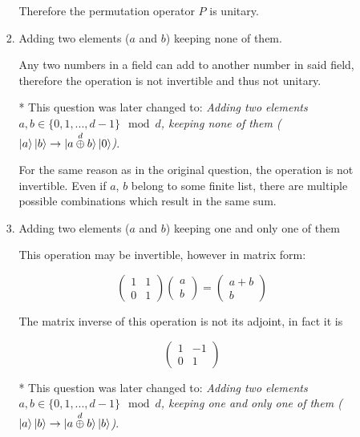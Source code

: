\documentclass[11pt]{article}
\begin{document}
\begin{enumerate}[label*=\arabic*.]
\begin{enumerate}[label*=\arabic*.]
\begin{enumerate}[label=(\alph*)]
            Therefore the permutation operator $P$ is unitary.
            
            \item Adding two elements ($a$ and $b$) keeping none of them.

            Any two numbers in a field can add to another number in said field, therefore the operation is not invertible and thus not unitary.
            
            * This question was later changed to: \emph{Adding two elements $a, b \in \{0, 1, ..., d-1\} \mod d$, keeping none of them ($\ket{a}\ket{b} \rightarrow 
            |a\overset{d}{\oplus} b\rangle\ket{0}$)}.
            
            For the same reason as in the original question, the operation is not invertible. Even if $a$, $b$ belong to some finite list, there are multiple possible combinations which result in the same sum.

            \item Adding two elements ($a$ and $b$) keeping one and only one of them

            This operation may be invertible, however in matrix form:

            $$
            \begin{pmatrix}
            1 & 1 \\
            0 & 1
            \end{pmatrix}
            \begin{pmatrix}
                a \\ b
            \end{pmatrix} =
            \begin{pmatrix}
                a+b \\ b
            \end{pmatrix}
            $$

            The matrix inverse of this operation is not its adjoint, in fact it is

            $$
            \begin{pmatrix}
                1 & -1\\
                0 & 1
            \end{pmatrix}
            $$

            * This question was later changed to: \emph{Adding two elements $a, b \in \{0, 1, ..., d-1\} \mod d$, keeping one and only one of them ($\ket{a}\ket{b} \rightarrow 
            |a\overset{d}{\oplus} b\rangle\ket{b}$)}.
            

\end{enumerate}
\end{enumerate}
\end{enumerate}
\end{document}
